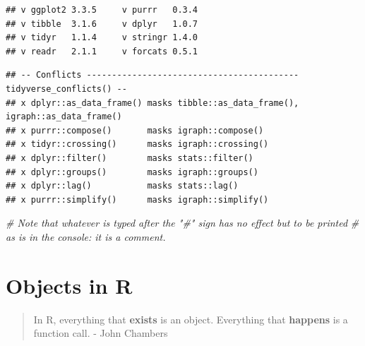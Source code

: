 \documentclass[
]{book}
\newenvironment{Shaded}{\begin{snugshade}}{\end{snugshade}}
\newcommand{\CommentTok}[1]{\textcolor[rgb]{0.56,0.35,0.01}{\textit{#1}}}
\begin{document}
\begin{verbatim}
## v ggplot2 3.3.5     v purrr   0.3.4
## v tibble  3.1.6     v dplyr   1.0.7
## v tidyr   1.1.4     v stringr 1.4.0
## v readr   2.1.1     v forcats 0.5.1
\end{verbatim}

\begin{verbatim}
## -- Conflicts ------------------------------------------ tidyverse_conflicts() --
## x dplyr::as_data_frame() masks tibble::as_data_frame(), igraph::as_data_frame()
## x purrr::compose()       masks igraph::compose()
## x tidyr::crossing()      masks igraph::crossing()
## x dplyr::filter()        masks stats::filter()
## x dplyr::groups()        masks igraph::groups()
## x dplyr::lag()           masks stats::lag()
## x purrr::simplify()      masks igraph::simplify()
\end{verbatim}

\begin{Shaded}
\begin{Highlighting}[]
\CommentTok{\# Note that whatever is typed after the "\#" sign has no effect but to be printed}
\CommentTok{\# as is in the console: it is a comment.}
\end{Highlighting}
\end{Shaded}

\hypertarget{objects-in-r}{%
\section{Objects in R}\label{objects-in-r}}

\begin{quote}
In R, everything that \textbf{exists} is an object. Everything that \textbf{happens} is a function call.
- John Chambers
\end{quote}
\end{document}
